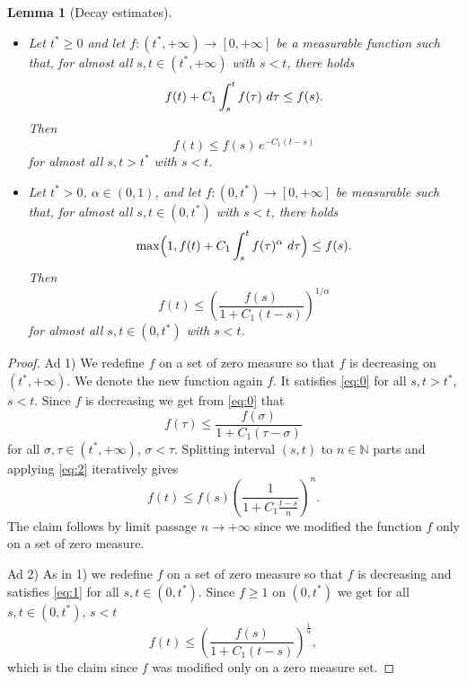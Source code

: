 \documentclass[10pt,a4paper]{amsart}
\newtheorem{lemma}{Lemma}
\newcommand{\N}{\mathbb N}
\newcommand{\dtau}{\,{\rm d} \tau}
\newcommand{\tstar}{t^*}
\begin{document}
\begin{lemma}[Decay estimates]\label{lem:decay} \ 
\begin{itemize}[left=0pt]
\item[1)]
Let $\tstar \geq 0$ and let $f : (\tstar, +\infty) \to [0, +\infty]$ be a measurable function such that, for almost all $s, t \in (\tstar, +\infty)$ with $s < t$, there holds
\begin{equation}\label{eq:0}
f(t) + C_1 \int_s^t f(\tau) \, \dtau \leq f(s).
\end{equation}
Then
$$
f(t) \leq f(s) \, e^{-C_1 (t-s)}
$$
for almost all $s, t > \tstar$ with $s < t$.

\item[2)] Let $\tstar > 0$, $\alpha \in (0,1)$, and let $f : (0, \tstar) \to [0, +\infty]$ be measurable such that, for almost all $s, t \in (0, \tstar)$ with $s < t$, there holds
\begin{equation}\label{eq:1}
\max\Bigl(1, f(t) + C_1 \int_s^t f(\tau)^\alpha \, \dtau \Bigr) \leq f(s).
\end{equation}
Then
$$
f(t) \leq \left(\frac{f(s)}{1 + C_1 (t-s)}\right)^{1/\alpha}
$$
for almost all $s, t \in (0, \tstar)$ with $s < t$.

\end{itemize}
\end{lemma}

\begin{proof}
  Ad 1)
  We redefine $f$ on a set of zero measure so that $f$ is decreasing on $(\tstar,+\infty)$. We denote the new function again $f$. It satisfies  \eqref{eq:0} for all $s,t>\tstar$, $s<t$. Since $f$ is decreasing we get from \eqref{eq:0} that 
  \begin{equation}\label{eq:2}
  f(\tau)\leq\frac{f(\sigma)}{1+C_1(\tau-\sigma)}
\end{equation}
for all $\sigma,\tau\in(\tstar,+\infty)$, $\sigma<\tau$.
Splitting interval $(s,t)$ to $n\in\N$ parts and applying \eqref{eq:2} iteratively gives
$$
  f(t)\leq f(s)\left(\frac1{1+C_1\frac{t-s}n}\right)^n.
$$
The claim follows by limit passage $n\to+\infty$ since we modified the function $f$ only on a set of zero measure.

Ad 2) As in 1) we redefine $f$ on a set of zero measure so that $f$ is decreasing and satisfies \eqref{eq:1} for all $s,t\in(0,\tstar)$. Since $f\geq 1$ on $(0,\tstar)$ we get for all $s,t\in (0,\tstar)$, $s<t$
  $$
  f(t)\leq \left(\frac{f(s)}{1+C_1(t-s)}\right)^{\frac1\alpha},
  $$
  which is the claim since $f$ was modified only on a zero measure set.  
\end{proof}
\end{document}
